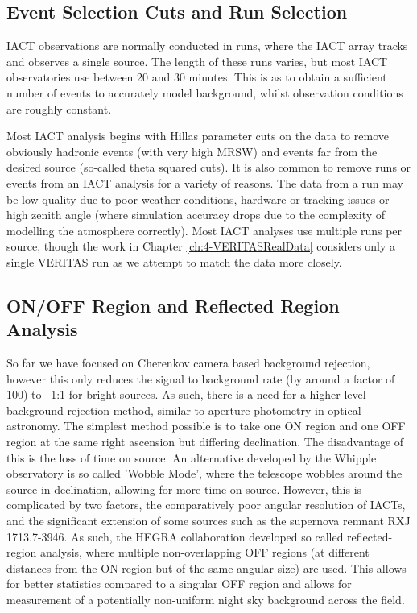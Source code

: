 \subsection{Event Selection Cuts and Run Selection}

IACT observations are normally conducted in runs, where the IACT array tracks and observes a single source. The length of these runs varies, but most IACT observatories use between 20 and 30 minutes. This is as to obtain a sufficient number of events to accurately model background, whilst observation conditions are roughly constant.

Most IACT analysis begins with Hillas parameter cuts on the data to remove obviously hadronic events (with very high MRSW) and events far from the desired source (so-called theta squared cuts).
It is also common to remove runs or events from an IACT analysis for a variety of reasons. The data from a run may be low quality due to poor weather conditions, hardware or tracking issues or high zenith angle (where simulation accuracy drops due to the complexity of modelling the atmosphere correctly). Most IACT analyses use multiple runs per source, though the work in Chapter \ref{ch:4-VERITASRealData} considers only a single VERITAS run as we attempt to match the data more closely.

\subsection{ON/OFF Region and Reflected Region Analysis}
So far we have focused on Cherenkov camera based background rejection, however this only reduces the signal to background rate (by around a factor of 100) to ~1:1 for bright sources. As such, there is a need for a higher level background rejection method, similar to aperture photometry in optical astronomy. The simplest method possible is to take one ON region and one OFF region at the same right ascension but differing declination. The disadvantage of this is the loss of time on source. An alternative developed by the Whipple observatory is so called 'Wobble Mode', where the telescope wobbles around the source in declination, allowing for more time on source. However, this is complicated by two factors, the comparatively poor angular resolution of IACTs, and the significant extension of some sources such as the supernova remnant RXJ 1713.7-3946. As such, the HEGRA collaboration \cite{HEGRA} developed so called reflected-region analysis, where multiple non-overlapping OFF regions (at different distances from the ON region but of the same angular size) are used. This allows for better statistics compared to a singular OFF region and allows for measurement of a potentially non-uniform night sky background across the field. 

